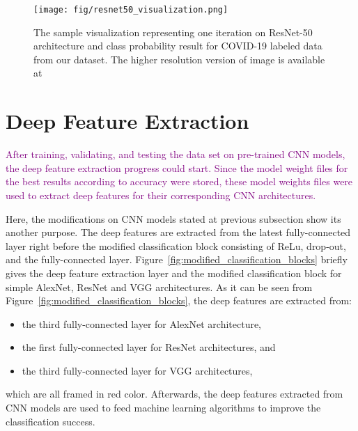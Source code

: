 \begin{landscape}
	\begin{figure}[h]
		\centering
		\texttt{[image: fig/resnet50\_visualization.png]}
		\vspace{1mm}
		\caption{The sample visualization representing one iteration on ResNet-50 architecture and class probability result for COVID-19 labeled data from our dataset. The higher resolution version of image is available at \\  \textcolor{blue}{}}
		\label{fig:resnet50_visualization}
	\end{figure}
\end{landscape}

\section{Deep Feature Extraction}

\textcolor{purple}{After training, validating, and testing the data set on pre-trained CNN models, the deep feature extraction progress could start. Since the model weight files for the best results according to accuracy were stored, these model weights files were used to extract deep features for their corresponding CNN architectures.}

Here, the modifications on CNN models stated at previous subsection show its another purpose. The deep features are extracted from the latest fully-connected layer right before the modified classification block consisting of ReLu, drop-out, and the fully-connected layer. Figure~\ref{fig:modified_classification_blocks} briefly gives the deep feature extraction layer and the modified classification block for simple AlexNet, ResNet and VGG architectures. As it can be seen from Figure~\ref{fig:modified_classification_blocks}, the deep features are extracted from:

\begin{itemize}
	\item the third fully-connected layer for AlexNet architecture,
	\item the first fully-connected layer for ResNet architectures, and
	\item the third fully-connected layer for VGG architectures,
\end{itemize}

which are all framed in red color. 
Afterwards, the deep features extracted from CNN models are used to feed machine learning algorithms to improve the classification success.

